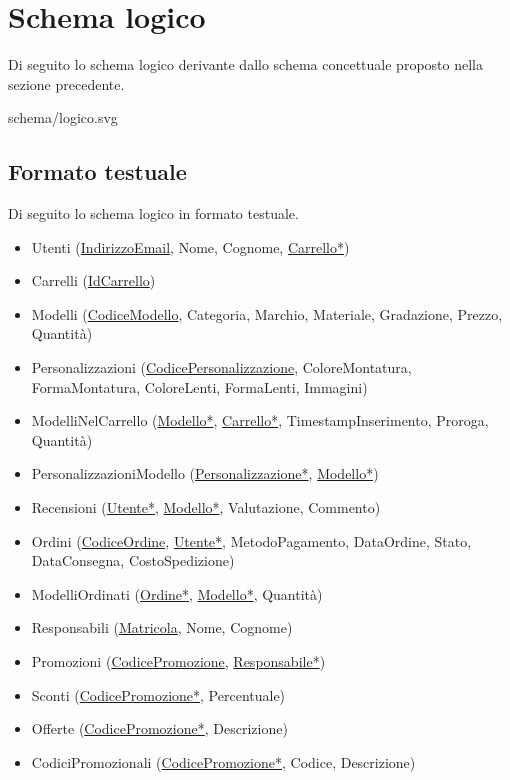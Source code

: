 \section{Schema logico}
Di seguito lo schema logico derivante dallo schema concettuale proposto nella sezione precedente.

\begin{center}
	 {schema/logico.svg}
\end{center}

\subsection{Formato testuale}
Di seguito lo schema logico in formato testuale.
\begin{itemize}
	\item Utenti (\underline{IndirizzoEmail}, Nome, Cognome, \underline{Carrello*})
	\item Carrelli (\underline{IdCarrello})
	\item Modelli (\underline{CodiceModello}, Categoria, Marchio, Materiale, Gradazione, Prezzo,
	      Quantità)
	\item Personalizzazioni (\underline{CodicePersonalizzazione}, ColoreMontatura, FormaMontatura,
	      ColoreLenti, FormaLenti, Immagini)
	\item ModelliNelCarrello (\underline{Modello*}, \underline{Carrello*}, TimestampInserimento,
	      Proroga, Quantità)
	\item PersonalizzazioniModello (\underline{Personalizzazione*}, \underline{Modello*})
	\item Recensioni (\underline{Utente*}, \underline{Modello*}, Valutazione, Commento)
	\item Ordini (\underline{CodiceOrdine}, \underline{Utente*}, MetodoPagamento, DataOrdine,
	      Stato, DataConsegna, CostoSpedizione)
	\item ModelliOrdinati (\underline{Ordine*}, \underline{Modello*}, Quantità)
	\item Responsabili (\underline{Matricola}, Nome, Cognome)
	\item Promozioni (\underline{CodicePromozione}, \underline{Responsabile*})
	\item Sconti (\underline{CodicePromozione*}, Percentuale)
	\item Offerte (\underline{CodicePromozione*}, Descrizione)
	\item CodiciPromozionali (\underline{CodicePromozione*}, Codice, Descrizione)
\end{itemize}


